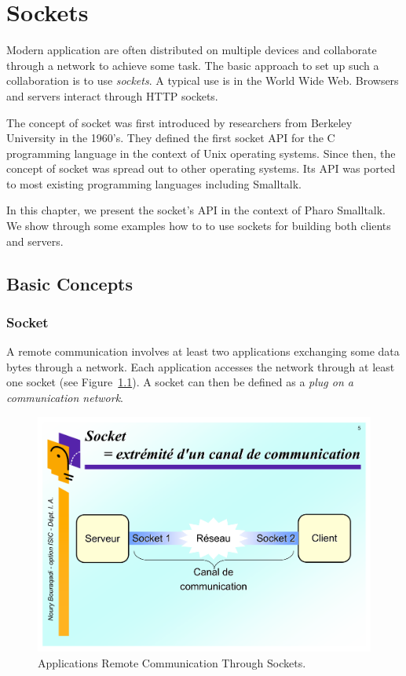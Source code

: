 \documentclass[a4paper,10pt,twoside]{book}
\begin{document}
	\sloppy
\fi
\newcommand{\nouryComment}[1]{\textcolor{red}{\textbf{\emph{#1}}}}


\chapter{Sockets}\label{cha:sockets}
\chapterauthor{\authornoury{}}

Modern application are often distributed on multiple devices and collaborate through a network to achieve some task.
The basic approach to set up such a collaboration is to use \textit{sockets}.
A typical use is in the World Wide Web. Browsers and servers interact through HTTP sockets.

The concept of socket was first introduced by researchers from Berkeley University in the 1960's. They defined the first socket API for the C programming language in the context of Unix operating systems. Since then, the concept of socket was spread out to other operating systems. 
Its API was ported to most existing programming languages including Smalltalk.

In this chapter, we present the socket's API in the context of Pharo Smalltalk.
We show through some examples how to to use sockets for building both clients and servers.

\section{Basic Concepts}
\subsection{Socket}
A remote communication involves at least two applications exchanging some data bytes through a network. Each application accesses the network through at least one socket (see Figure~\ref{fig:socketConcept}).
A socket can then be defined as a \textit{plug on a communication network}.

\begin{figure}[ht]\centering
	\includegraphics[width=.75\linewidth]{socketConcept}
	\caption{Applications Remote Communication Through Sockets.}
	\label{fig:socketConcept}
\end{figure}
\end{document}
